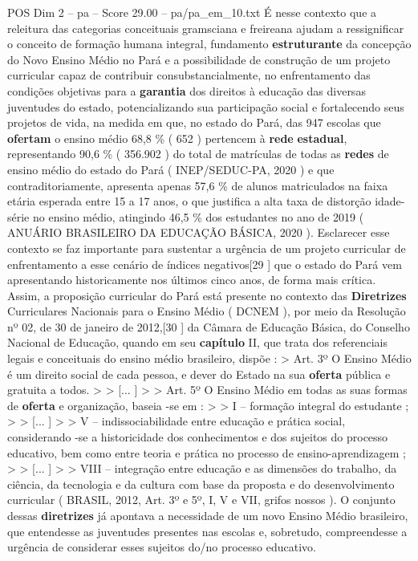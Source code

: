 \begin{textsample}{POS Dim 2 – pa – Score 29.00 – pa/pa\_em\_10.txt}
É nesse contexto que a releitura das categorias conceituais gramsciana e freireana ajudam a ressignificar o conceito de formação humana integral, fundamento \textbf{estruturante} da concepção do Novo Ensino Médio no Pará e a possibilidade de construção de um projeto curricular capaz de contribuir consubstancialmente, no enfrentamento das condições objetivas para a \textbf{garantia} dos direitos à educação das diversas juventudes do estado, potencializando sua participação social e fortalecendo seus projetos de vida, na medida em que, no estado do Pará, das 947 escolas que \textbf{ofertam} o ensino médio 68,8 \% ( 652 ) pertencem à \textbf{rede} \textbf{estadual}, representando 90,6 \% ( 356.902 ) do total de matrículas de todas as \textbf{redes} de ensino médio do estado do Pará ( INEP/SEDUC-PA, 2020 ) e que contraditoriamente, apresenta apenas 57,6 \% de alunos matriculados na faixa etária esperada entre 15 a 17 anos, o que justifica a alta taxa de distorção idade-série no ensino médio, atingindo 46,5 \% dos estudantes no ano de 2019 ( ANUÁRIO BRASILEIRO DA EDUCAÇÃO BÁSICA, 2020 ).
Esclarecer esse contexto se faz importante para sustentar a urgência de um projeto curricular de enfrentamento a esse cenário de índices negativos[29 ] que o estado do Pará vem apresentando historicamente nos últimos cinco anos, de forma mais crítica.
Assim, a proposição curricular do Pará está presente no contexto das \textbf{Diretrizes} Curriculares Nacionais para o Ensino Médio ( DCNEM ), por meio da Resolução nº 02, de 30 de janeiro de 2012,[30 ] da Câmara de Educação Básica, do Conselho Nacional de Educação, quando em seu \textbf{capítulo} II, que trata dos referenciais legais e conceituais do ensino médio brasileiro, dispõe : > Art. 3º O Ensino Médio é um direito social de cada pessoa, e dever do Estado na sua \textbf{oferta} pública e gratuita a todos. > > [... ] > > Art. 5º O Ensino Médio em todas as suas formas de \textbf{oferta} e organização, baseia -se em : > > I – formação integral do estudante ; > > [... ] > > V – indissociabilidade entre educação e prática social, considerando -se a historicidade dos conhecimentos e dos sujeitos do processo educativo, bem como entre teoria e prática no processo de ensino-aprendizagem ; > > [... ] > > VIII – integração entre educação e as dimensões do trabalho, da ciência, da tecnologia e da cultura com base da proposta e do desenvolvimento curricular ( BRASIL, 2012, Art. 3º e 5º, I, V e VII, grifos nossos ).
O conjunto dessas \textbf{diretrizes} já apontava a necessidade de um novo Ensino Médio brasileiro, que entendesse as juventudes presentes nas escolas e, sobretudo, compreendesse a urgência de considerar esses sujeitos do/no processo educativo.

\end{textsample}
